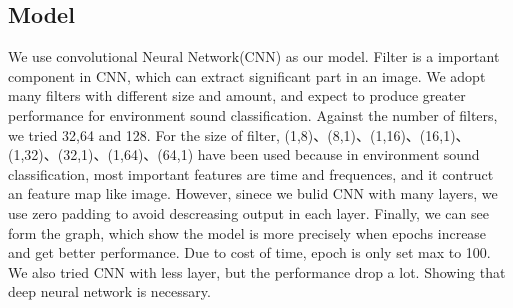 \subsection{Model}
We use convolutional Neural Network(CNN) as our model. Filter is a important component in CNN, which can extract 
significant part in an image. We adopt many filters with different size and amount, and expect to produce greater 
performance for environment sound classification. Against the number of filters, we tried 32,64 and 128. For the size of filter,
(1,8)、(8,1)、(1,16)、(16,1)、(1,32)、(32,1)、(1,64)、(64,1) have been used because in environment sound classification, most important features
are time and frequences, and it contruct an feature map like image. 
However, sinece we bulid CNN with many layers, we use zero padding to avoid descreasing output in each layer. Finally, we can see form the graph,
which show the model is more precisely when epochs increase and get better performance. Due to cost of time, epoch is only set max to 100.
We also tried CNN with less layer, but the performance drop a lot. Showing that deep neural network is necessary. 
